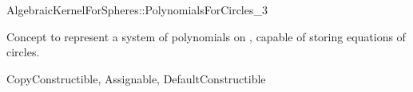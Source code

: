 \begin{ccRefConcept}{AlgebraicKernelForSpheres::PolynomialsForCircles_3}

\ccDefinition

Concept to represent a system of polynomials on ,
capable of storing equations of circles. 

\ccRefines
CopyConstructible, Assignable, DefaultConstructible






\ccHasModels


\ccSeeAlso


\end{ccRefConcept}
